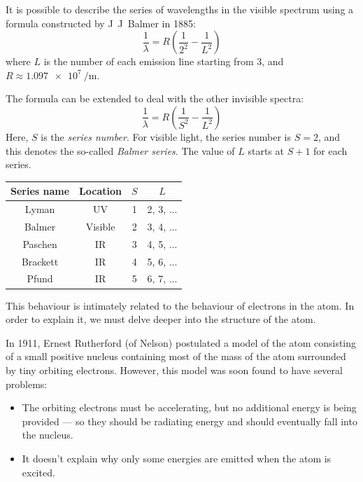 \documentclass[answers]{exam}
\theoremstyle{definition}
\begin{document}
It is possible to describe the series of wavelengths in the visible spectrum using
a formula constructed by J~J~Balmer in 1885:
\begin{displaymath}
  \frac{1}{\lambda} = R\left( \frac{1}{2^2} - \frac{1}{L^2} \right)
\end{displaymath}
where $ L $ is the number of each emission line starting from 3, and $ R \approx \SI{1.097e7}{\per\metre} $.

The formula can be extended to deal with the other invisible spectra:
\begin{displaymath}
  \frac{1}{\lambda} = R\left( \frac{1}{S^2} - \frac{1}{L^2} \right)
\end{displaymath}
Here, $ S $ is the \textit{series number}. For visible light, the series number is $ S = 2 $,
and this denotes the so-called \textit{Balmer series}. The value of $ L $ starts at $ S + 1 $ for
each series.

\begin{center}
\begin{tabular}{|c|c|c|c|}\hline
  \textbf{Series name} & \textbf{Location} & $ S $ & $ L $\\\hline
  Lyman & UV & 1 & 2, 3, ...\\
  Balmer & Visible & 2 & 3, 4, ...\\
  Paschen & IR & 3 & 4, 5, ...\\
  Brackett & IR & 4 & 5, 6, ...\\
  Pfund & IR & 5 & 6, 7, ...\\\hline
\end{tabular}
\end{center}

This behaviour is intimately related to the behaviour of electrons in the atom. In order to
explain it, we must delve deeper into the structure of the atom.

In 1911, Ernest Rutherford (of Nelson) postulated a model of the atom consisting of a small
positive nucleus containing most of the mass of the atom surrounded by tiny orbiting electrons.
However, this model was soon found to have several problems:
\begin{itemize}
  \item The orbiting electrons must be accelerating, but no additional energy is being provided ---
        so they should be radiating energy and should eventually fall into the nucleus.
  \item It doesn't explain why only some energies are emitted when the atom is excited.
\end{itemize}
\end{document}
